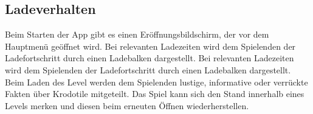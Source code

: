 \subsection{Ladeverhalten}
\begin {requirements}
	 Beim Starten der App gibt es einen Eröffnungsbildschirm, der vor dem Hauptmenü geöffnet wird.
	 Bei relevanten Ladezeiten wird dem Spielenden der Ladefortschritt durch einen Ladebalken dargestellt.
	 Bei relevanten Ladezeiten wird dem Spielenden der Ladefortschritt durch einen Ladebalken dargestellt.
	 Beim Laden des Level werden dem Spielenden lustige, informative oder verrückte Fakten über Krodotile mitgeteilt.
	 Das Spiel kann sich den Stand innerhalb eines Levels merken und diesen beim erneuten Öffnen wiederherstellen.
\end {requirements}
